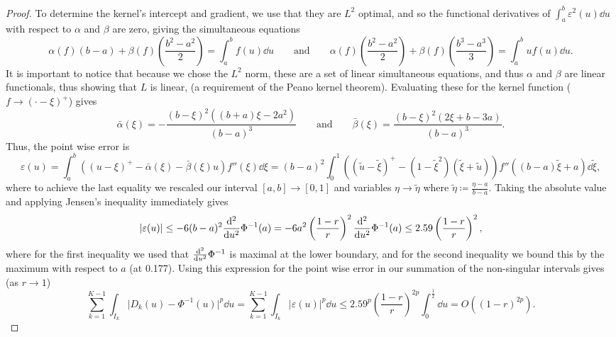 \documentclass[manuscript,review]{acmart}
\begin{document}
\begin{proof}
To determine the kernel's intercept and gradient, we use that they are $ L^2 $ optimal, and so the functional derivatives of $ \int_a^b \varepsilon^2(u) \dd{u} $ with respect to $ \alpha $ and $ \beta $ are zero, giving the simultaneous equations
\begin{equation*}
\alpha(f)(b-a) + \beta(f) \left(\dfrac{b^2 - a^2}{2}\right)  = \int_{a}^{b} f(u) \dd{u} 
\qquad \text{and} \qquad 
\alpha(f)\left(\dfrac{b^2 - a^2}{2}\right) + \beta(f) \left(\dfrac{b^3 - a^3}{3}\right)  = \int_{a}^{b} u f(u) \dd{u}.
\end{equation*}
It is important to notice that because we chose the $ L^2 $ norm, these are a set of linear simultaneous equations, and thus $ \alpha $ and $ \beta $ are linear functionals, thus showing that $ L $ is linear, (a requirement of the Peano kernel theorem). Evaluating these for the kernel function ($ f \to (\cdot - \xi)^+  $) gives
\begin{equation*}
\bar{\alpha}(\xi)  = - \dfrac{(b - \xi)^2 ((b+a)\xi - 2a^2)}{(b - a)^3} 
\qquad \text{and} \qquad 
\label{eqt:peano_kernel_coefficient}
\bar{\beta}(\xi) = \dfrac{(b - \xi)^2 (2\xi + b - 3a)}{(b - a)^3}.
\end{equation*}
Thus, the point wise error is 
\begin{equation*}
\varepsilon(u)  = \int_{a}^{b} ((u - \xi)^+ - \bar{\alpha}(\xi) - \bar{\beta}(\xi) u ) f''(\xi) \dd{\xi} = (b - a)^2 \int_{0}^{1} ((\tilde{u} - \tilde{\xi})^+ - (1 - \tilde{\xi}^2)(\tilde{\xi} + \tilde{u})) f''((b - a)\tilde{\xi} + a) \dd{\tilde{\xi}},
\end{equation*}
where to achieve the last equality we rescaled our interval $ [a, b] \to [0, 1] $  and variables $ \eta \to \tilde{\eta}  $ where $ \tilde{\eta} \coloneqq \tfrac{\eta - a}{b - a} $. Taking the absolute value and applying Jensen's inequality immediately gives 
\begin{equation*}
\lvert \varepsilon(u) \rvert \leq - 6 (b - a)^2  {\dv[2]{}{u}}\Phi^{-1}(a) = - 6 a^2 \left(\dfrac{1-r}{r}\right)^2  {\dv[2]{}{u}}\Phi^{-1}(a) \leq 2.59 \left(\dfrac{1-r}{r}\right)^2,
\end{equation*}
where for the first inequality we used that $ {\dv[2]{}{u}}\Phi^{-1} $ is maximal at the lower boundary, and for the second inequality we bound this by the maximum with respect to $ a $ (at 0.177). Using this expression for the point wise error in our summation of the non-singular intervals gives (as $ r \to 1 $)
\begin{equation*}
 \sum_{k=1}^{K-1} \int_{I_k} \lvert D_k(u) - \Phi^{-1}(u)\rvert^p \dd{u}
= \sum_{k = 1}^{K - 1} \int_{I_k} \lvert\varepsilon(u)\rvert^p \dd{u}
\leq 2.59^p \left(\dfrac{1 - r}{r}\right)^{2p}  \int_{0}^{\frac{1}{2}} \dd{u}
= O((1-r)^{2p}).
\end{equation*}


\end{proof}
\end{document}
